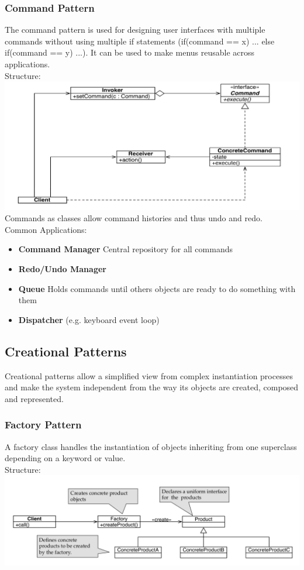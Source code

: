 \subsubsection{Command Pattern}
The command pattern is used for designing user interfaces with multiple commands without using multiple if statements (if(command == x) {...} else if(command == y) ...).
It can be used to make menus reusable across applications.\\
Structure:\\
\includegraphics[width=\linewidth]{images/pattern_command.png}
Commands as classes allow command histories and thus undo and redo.\\
Common Applications:
\begin{itemize}
  \item \textbf{Command Manager} Central repository for all commands
  \item \textbf{Redo/Undo Manager}
  \item \textbf{Queue} Holds commands until others objects are ready to do something with them
  \item \textbf{Dispatcher} (e.g. keyboard event loop)
\end{itemize}
\newpage


\subsection{Creational Patterns}
Creational patterns allow a simplified view from complex instantiation processes and make the system independent from the way its objects are created, composed and represented.

\subsubsection{Factory Pattern}
A factory class handles the instantiation of objects inheriting from one superclass depending on a keyword or value.\\
Structure:\\
\includegraphics[width=\linewidth]{images/pattern_factory.png}
\newpage

